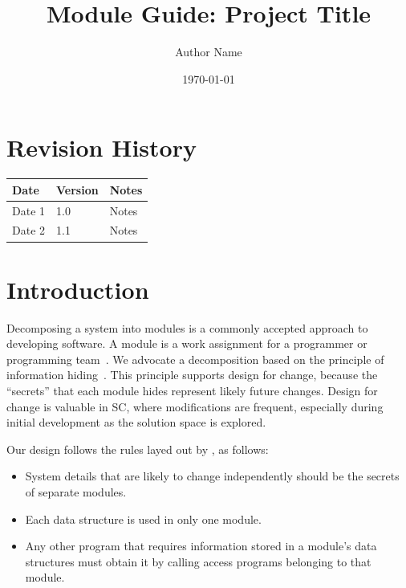\documentclass[12pt, titlepage]{article}
\begin{document}
	
	\title{Module Guide: Project Title} 
	\author{Author Name}
	\date{\today}
	
	\maketitle
	
	
	\section{Revision History}
	
	\begin{tabularx}{\textwidth}{p{3cm}p{2cm}X}
		\toprule {\bf Date} & {\bf Version} & {\bf Notes}\\
		\midrule
		Date 1 & 1.0 & Notes\\
		Date 2 & 1.1 & Notes\\
		\bottomrule
	\end{tabularx}
	
	\newpage
	
	\tableofcontents
	
	\listoftables
	
	\listoffigures
	
	\newpage
	
	
	\section{Introduction}
	
	Decomposing a system into modules is a commonly accepted approach to developing
	software.  A module is a work assignment for a programmer or programming
	team~\citep{ParnasEtAl1984}.  We advocate a decomposition
	based on the principle of information hiding~\citep{Parnas1972a}.  This
	principle supports design for change, because the ``secrets'' that each module
	hides represent likely future changes.  Design for change is valuable in SC,
	where modifications are frequent, especially during initial development as the
	solution space is explored.  
	
	Our design follows the rules layed out by \citet{ParnasEtAl1984}, as follows:
	\begin{itemize}
		\item System details that are likely to change independently should be the
		secrets of separate modules.
		\item Each data structure is used in only one module.
		\item Any other program that requires information stored in a module's data
		structures must obtain it by calling access programs belonging to that module.
	\end{itemize}
	
\end{document}
